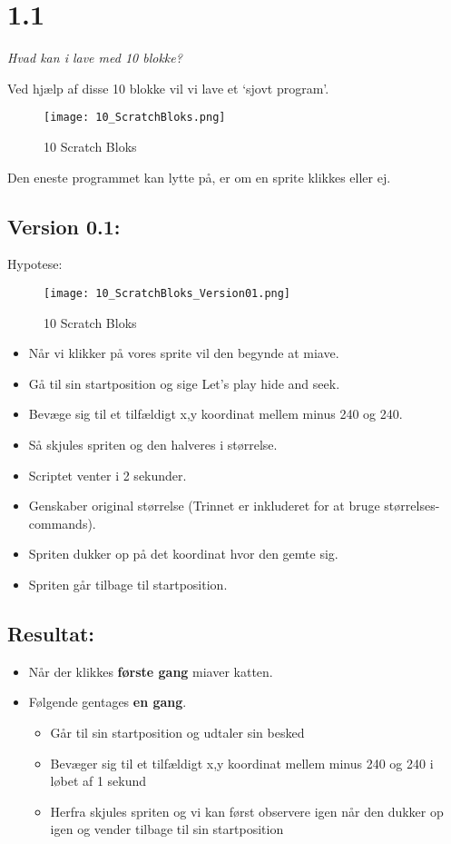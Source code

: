 \section{1.1}

\textit{Hvad kan i lave med 10 blokke?}

Ved hjælp af disse 10 blokke vil vi lave et ‘sjovt program’.

\begin{figure}[ht]
	\centering
	\texttt{[image: 10\_ScratchBloks.png]}
	\caption{{10 Scratch Bloks}}
	\label{fig:10Bloks}
\end{figure}

Den eneste programmet kan lytte på, er om en sprite klikkes eller ej.

\subsection{Version 0.1:}

Hypotese:

\begin{figure}[ht]
	\centering
	\texttt{[image: 10\_ScratchBloks\_Version01.png]}
	\caption{{10 Scratch Bloks}}
	\label{fig:Version_0.1}
\end{figure}

\begin{itemize}
	\item Når vi klikker på vores sprite vil den begynde at miave.
	\item Gå til sin startposition og sige Let’s play hide and seek.
	\item Bevæge sig til et tilfældigt x,y koordinat mellem minus 240 og 240.	
	\item Så skjules spriten og den halveres i størrelse.
	\item Scriptet venter i 2 sekunder.
	\item Genskaber original størrelse (Trinnet er inkluderet for at bruge størrelses-commands).
	\item Spriten dukker op på det koordinat hvor den gemte sig.
	\item Spriten går tilbage til startposition.
\end{itemize}

\subsection{Resultat:}

\begin{itemize}
	\item Når der klikkes \textbf{første gang} miaver katten.
	\item Følgende gentages \textbf{en gang}.
	\begin{itemize}
		\item Går til sin startposition og udtaler sin besked
		\item Bevæger sig til et tilfældigt x,y koordinat mellem minus 240 og 240 i løbet af 1 sekund
		\item Herfra skjules spriten og vi kan først observere igen når den dukker op igen og vender tilbage til sin startposition
	\end{itemize}
\end{itemize}

